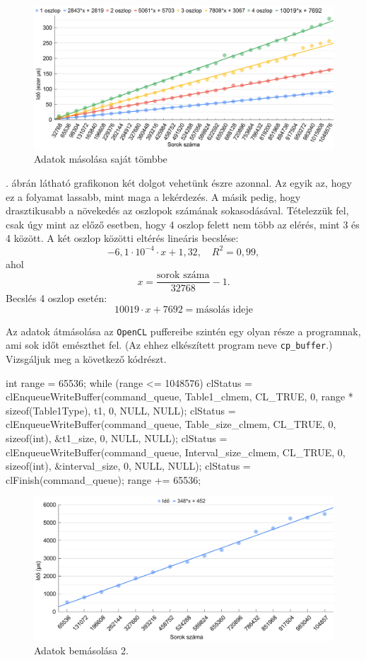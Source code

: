 \begin{figure}[h!]
\centering
\includegraphics[width=\textwidth]{images/graph/ccopy.png}
\caption{Adatok másolása saját tömbbe}
\label{fig:ccopy}
\end{figure}

. ábrán látható grafikonon két dolgot vehetünk észre azonnal. Az egyik az, hogy ez a folyamat lassabb, mint maga a lekérdezés. A másik pedig, hogy drasztikusabb a növekedés az oszlopok számának sokasodásával.
Tételezzük fel, csak úgy mint az előző esetben, hogy 4 oszlop felett nem több az elérés, mint 3 és 4 között.
A két oszlop közötti eltérés lineáris becslése:
$$-6,1 \cdot 10^{-4} \cdot x + 1,32, \quad R^2=0,99,$$ 
ahol
$$x = \dfrac{\text{sorok száma}}{32768} - 1.$$
Becslés 4 oszlop esetén:
$$ 10019 \cdot x + 7692 = \text{másolás ideje}$$


Az adatok átmásolása az \texttt{OpenCL} puffereibe szintén egy olyan része a programnak, ami sok időt emészthet fel.
(Az ehhez elkészített program neve \texttt{cp\_buffer}.)
Vizsgáljuk meg a következő kódrészt.
\begin{python}
int range = 65536;
while (range <= 1048576)
{
 clStatus = clEnqueueWriteBuffer(command_queue, Table1_clmem,
  CL_TRUE, 0, range * sizeof(Table1Type), t1, 0, NULL, NULL);
 clStatus = clEnqueueWriteBuffer(command_queue, Table_size_clmem,
  CL_TRUE, 0, sizeof(int), &t1_size, 0, NULL, NULL);
 clStatus = clEnqueueWriteBuffer(command_queue, Interval_size_clmem,
  CL_TRUE, 0, sizeof(int), &interval_size, 0, NULL, NULL);
 clStatus = clFinish(command_queue);
 range += 65536;
}
\end{python}

\begin{figure}[h!]
\centering
\includegraphics[width=\textwidth]{images/graph/pufferin.png}
\caption{Adatok bemásolása 2.}
\label{fig:pufferin}
\end{figure}

